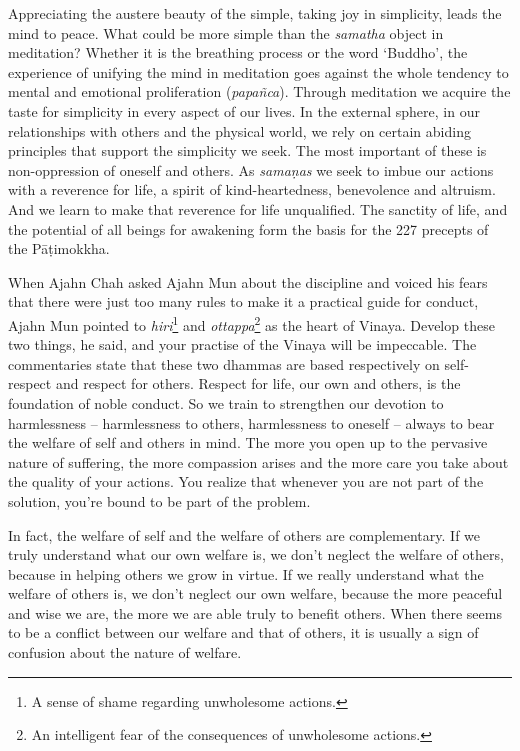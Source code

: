 Appreciating the austere beauty of the simple, taking joy in simplicity, 
leads the mind to peace. What could be more simple than the
\emph{samatha} object in meditation? Whether it is the breathing process
or the word `Buddho', the experience of unifying the mind in meditation
goes against the whole tendency to mental and emotional proliferation
 (\emph{papañca}). Through meditation we acquire the taste for simplicity
in every aspect of our lives. In the external sphere, in our
relationships with others and the physical world, we rely on certain
abiding principles that support the simplicity we seek. The most
important of these is non-oppression of oneself and others. As
\emph{samaṇas} we seek to imbue our actions with a reverence for life, a
spirit of kind-heartedness, benevolence and altruism. And we learn to
make that reverence for life unqualified. The sanctity of life, and the
potential of all beings for awakening form the basis for the 227
precepts of the Pāṭimokkha.

When Ajahn Chah asked Ajahn Mun about the
discipline and voiced his fears that there were just too many rules to
make it a practical guide for conduct, Ajahn Mun pointed to
\emph{hiri}\footnote{A sense of shame regarding unwholesome
actions.} and \emph{ottappa}\footnote{An intelligent fear of
the consequences of unwholesome actions.} as the heart of Vinaya. 
Develop these two things, he said, and your practise of the Vinaya will
be impeccable. The commentaries state that these two dhammas are based
respectively on self-respect and respect for others. Respect for life, 
our own and others, is the foundation of noble conduct. So we train to
strengthen our devotion to harmlessness -- harmlessness to others, 
harmlessness to oneself -- always to bear the welfare of self and
others in mind. The more you open up to the pervasive nature of
suffering, the more compassion arises and the more care you take about
the quality of your actions. You realize that whenever you are not part
of the solution, you're bound to be part of the problem. 

In fact, the welfare of self and the welfare of others are
complementary. If we truly understand what our own welfare is, we don't
neglect the welfare of others, because in helping others we grow in
virtue. If we really understand what the welfare of others is, we don't
neglect our own welfare, because the more peaceful and wise we are, the
more we are able truly to benefit others. When there seems to be a
conflict between our welfare and that of others, it is usually a sign of
confusion about the nature of welfare. 

